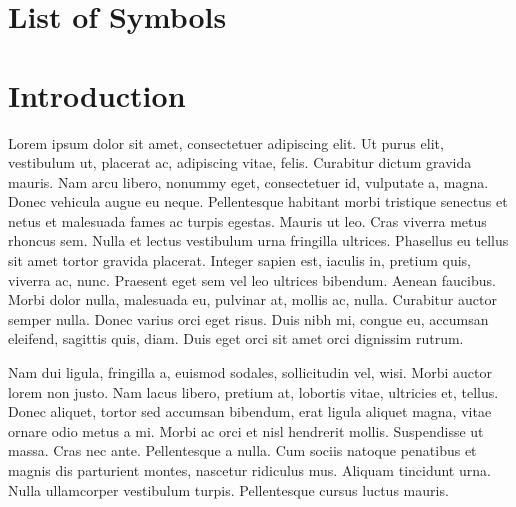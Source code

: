 \documentclass[12pt,a4paper,twoside,openright]{report}
\begin{document}
\cleardoublepage %


\chapter*{List of Symbols}

\cleardoublepage %



\tableofcontents

\cleardoublepage %


\chapter{Introduction}
Lorem ipsum dolor sit amet, consectetuer adipiscing elit. Ut purus elit, vestibulum ut, placerat ac, adipiscing vitae, felis. Curabitur dictum gravida mauris. Nam arcu libero, nonummy eget, consectetuer id, vulputate a, magna. Donec vehicula augue eu neque. Pellentesque habitant morbi tristique senectus et netus et malesuada fames ac turpis egestas. Mauris ut leo. Cras viverra metus rhoncus sem. Nulla et lectus vestibulum urna fringilla ultrices. Phasellus eu tellus sit amet tortor gravida placerat. Integer sapien est, iaculis in, pretium quis, viverra ac, nunc. Praesent eget sem vel leo ultrices bibendum. Aenean faucibus. Morbi dolor nulla, malesuada eu, pulvinar at, mollis ac, nulla. Curabitur auctor semper nulla. Donec varius orci eget risus. Duis nibh mi, congue eu, accumsan eleifend, sagittis quis, diam. Duis eget orci sit amet orci dignissim rutrum.

Nam dui ligula, fringilla a, euismod sodales, sollicitudin vel, wisi. Morbi auctor lorem non justo. Nam lacus libero, pretium at, lobortis vitae, ultricies et, tellus. Donec aliquet, tortor sed accumsan bibendum, erat ligula aliquet magna, vitae ornare odio metus a mi. Morbi ac orci et nisl hendrerit mollis. Suspendisse ut massa. Cras nec ante. Pellentesque a nulla. Cum sociis natoque penatibus et magnis dis parturient montes, nascetur ridiculus mus. Aliquam tincidunt urna. Nulla ullamcorper vestibulum turpis. Pellentesque cursus luctus mauris.
\end{document}
